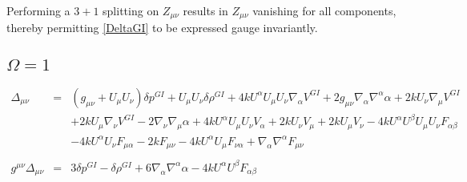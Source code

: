 \documentclass[10pt,letterpaper]{article}
\numberwithin{equation}{section}
\begin{document}
Performing a $3+1$ splitting on $Z_{\mu\nu}$ results in $Z_{\mu\nu}$ vanishing for all components, thereby permitting \eqref{DeltaGI} to be expressed gauge invariantly.
%
%
\newpage
\begin{appendices}
\section{$\Omega = 1$}
\begin{eqnarray}
\Delta_{\mu\nu}&=& (g_{\mu \nu } + U_{\mu } U_{\nu }) \delta p^{GI}{} + U_{\mu } U_{\nu } \delta \rho^{GI}{} + 4 k U^{\alpha } U_{\mu } U_{\nu } \nabla_{\alpha }V^{GI}{} + 2 g_{\mu \nu } \nabla_{\alpha }\nabla^{\alpha }\alpha + 2 k U_{\nu } \nabla_{\mu }V^{GI}{} \nonumber \\ 
&& + 2 k U_{\mu } \nabla_{\nu }V^{GI}{} - 2 \nabla_{\nu }\nabla_{\mu }\alpha +4 k U^{\alpha } U_{\mu } U_{\nu } V_{\alpha } + 2 k U_{\nu } V_{\mu } + 2 k U_{\mu } V_{\nu }-4 k U^{\alpha } U^{\beta } U_{\mu } U_{\nu } F_{\alpha \beta } \nonumber \\ 
&& - 4 k U^{\alpha } U_{\nu } F_{\mu \alpha } - 2 k F_{\mu \nu } - 4 k U^{\alpha } U_{\mu } F_{\nu \alpha } + \nabla_{\alpha }\nabla^{\alpha }F_{\mu \nu }
\\  \nonumber\\ 
g^{\mu\nu}\Delta_{\mu\nu}&=& 3 \delta p^{GI}{} -  \delta \rho^{GI}{} + 6 \nabla_{\alpha }\nabla^{\alpha }\alpha -4 k U^{\alpha } U^{\beta } F_{\alpha \beta }
\end{eqnarray}
%
%

\end{appendices}
\end{document}
